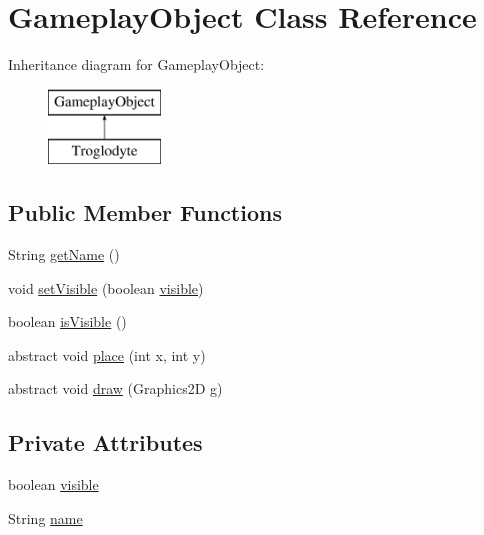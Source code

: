 \hypertarget{classGameplayObject}{\section{Gameplay\-Object Class Reference}
\label{classGameplayObject}
}
Inheritance diagram for Gameplay\-Object\-:\begin{figure}[H]
\begin{center}
\leavevmode
\includegraphics[height=2.000000cm]{da/df6/classGameplayObject}
\end{center}
\end{figure}
\subsection*{Public Member Functions}
\begin{DoxyCompactItemize}
\item 
String \hyperlink{classGameplayObject_ab0356b4a3f2d8a89f44fa8ae5389b764}{get\-Name} ()
\item 
void \hyperlink{classGameplayObject_a1af215eb801ca7acb2e143d60c5f26b2}{set\-Visible} (boolean \hyperlink{classGameplayObject_ad33ca23e562d57352dffda8631b15909}{visible})
\item 
boolean \hyperlink{classGameplayObject_ac533926c9b2fb82d8a7d47d7a5dbff4d}{is\-Visible} ()
\item 
abstract void \hyperlink{classGameplayObject_ad99f71d67a42e68dad3f923adc8a2699}{place} (int x, int y)
\item 
abstract void \hyperlink{classGameplayObject_ad0e03d54842aa2bb721648ad702ef350}{draw} (Graphics2\-D g)
\end{DoxyCompactItemize}
\subsection*{Private Attributes}
\begin{DoxyCompactItemize}
\item 
boolean \hyperlink{classGameplayObject_ad33ca23e562d57352dffda8631b15909}{visible}
\item 
String \hyperlink{classGameplayObject_a0b0fe50720b6ea4dc9261295cdfb7a0c}{name}
\end{DoxyCompactItemize}


